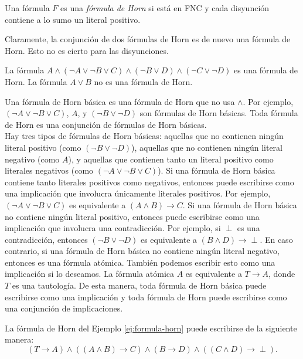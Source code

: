\documentclass[12pt,a4paper]{book}
\begin{document}
    \begin{definicion}\label{def:formula-horn}
        Una fórmula $F$ es una \textit{fórmula de Horn} si está en FNC y cada disyunción contiene a lo sumo un literal
        positivo.
    \end{definicion}

    Claramente, la conjunción de dos fórmulas de Horn es de nuevo una fórmula de Horn. Esto no es cierto para las
    disyunciones.

    \begin{ejemplo}\label{ej:formula-horn}
        La fórmula $A\wedge(\neg A\vee\neg B\vee C)\wedge(\neg B\vee D)\wedge(\neg C\vee\neg D)$ es una fórmula de Horn. La
        fórmula $A\vee B$ no es una fórmula de Horn.
    \end{ejemplo}

    Una fórmula de Horn básica es una fórmula de Horn que no usa $\wedge$. Por ejemplo, $(\neg A\vee\neg B\vee C)$, $A$, y
    $(\neg B\vee\neg D)$ son fórmulas de Horn básicas. Toda fórmula de Horn es una conjunción de fórmulas de Horn básicas.\\
    Hay tres tipos de fórmulas de Horn básicas: aquellas que no contienen ningún literal positivo (como $(\neg B\vee\neg D)$),
    aquellas que no contienen ningún literal negativo (como $A$), y aquellas que contienen tanto un literal positivo como
    literales negativos (como $(\neg A\vee\neg B\vee C)$). Si una fórmula de Horn básica contiene tanto literales positivos
    como negativos, entonces puede escribirse como una implicación que involucra únicamente literales positivos. Por
    ejemplo, $(\neg A\vee\neg B\vee C)$ es equivalente a $(A\wedge B)\rightarrow C$. Si una fórmula de Horn básica no contiene
    ningún literal positivo, entonces puede escribirse como una implicación que involucra una contradicción. Por ejemplo, si
    $\perp$ es una contradicción, entonces $(\neg B\vee\neg D)$ es equivalente a $(B\wedge D)\rightarrow\perp$. En caso
    contrario, si una fórmula de Horn básica no contiene ningún literal negativo, entonces es una fórmula atómica. También
    podemos escribir esto como una implicación si lo deseamos. La fórmula atómica $A$ es equivalente a $T\rightarrow A$,
    donde $T$ es una tautología. De esta manera, toda fórmula de Horn básica puede escribirse como una implicación y toda
    fórmula de Horn puede escribirse como una conjunción de implicaciones.

    \begin{ejemplo}\label{ej:horn-como-implicaciones}
        La fórmula de Horn del Ejemplo \ref{ej:formula-horn} puede escribirse de la siguiente manera:
        \begin{equation*}
            (T\rightarrow A)\wedge((A\wedge B)\rightarrow C)\wedge(B\rightarrow D)\wedge((C\wedge D)\rightarrow\perp).
        \end{equation*}
    \end{ejemplo}
\end{document}
